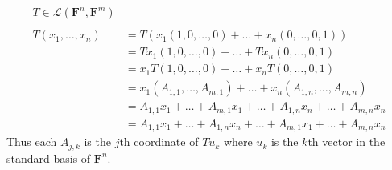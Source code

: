 \documentclass[a4paper]{article}
\begin{document}
%
\newcommand \F [1]  { \mathbf{F}^{#1} }
\newcommand \LFnFm  { \mathcal{L}(\F{n},\F{m}) }
%
\large
\begin{align*}
    T \in \LFnFm
\\
\\
    T(x_1, \dots, x_n)
        &= T ( x_1(1, 0, \dots, 0) + \dots + x_n(0, \dots, 0, 1) ) \\
        &= T x_1(1, 0, \dots, 0) + \dots + T x_n(0, \dots, 0, 1) \\
        &= x_1 T(1, 0, \dots, 0) + \dots + x_n T (0, \dots, 0, 1) \\
        &= x_1 (A_{1,1},\dots,A_{m,1}) + \dots + x_n (A_{1,n},\dots,A_{m,n}) \\
        &= A_{1,1}x_1+\dots+A_{m,1}x_1 +\dots+ A_{1,n}x_n+\dots+A_{m,n}x_n \\
        &= A_{1,1}x_1+\dots+A_{1,n}x_n +\dots+ A_{m,1}x_1+\dots+A_{m,n}x_n
\end{align*}
Thus each $A_{j,k}$ is the $j$th coordinate of $Tu_k$ where $u_k$ is the $k$th vector in the standard basis of $\F{n}$.
\end{document}
